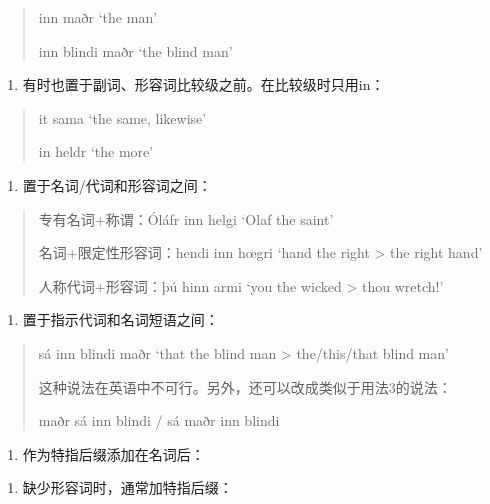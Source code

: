 \begin{quote}
inn maðr `the man'

inn blindi maðr `the blind man'
\end{quote}

\begin{enumerate}
\def\labelenumi{\arabic{enumi})}
\setcounter{enumi}{1}
\item
  有时也置于副词、形容词比较级之前。在比较级时只用in：
\end{enumerate}

\begin{quote}
it sama `the same, likewise'

in heldr `the more'
\end{quote}

\begin{enumerate}
\def\labelenumi{\arabic{enumi})}
\setcounter{enumi}{2}
\item
  置于名词/代词和形容词之间：
\end{enumerate}

\begin{quote}
专有名词+称谓：Óláfr inn helgi `Olaf the saint'

名词+限定性形容词：hendi inn hœgri `hand the right \textgreater{} the
right hand'

人称代词+形容词：þú hinn armi `you the wicked \textgreater{} thou
wretch!'
\end{quote}

\begin{enumerate}
\def\labelenumi{\arabic{enumi})}
\setcounter{enumi}{3}
\item
  置于指示代词和名词短语之间：
\end{enumerate}

\begin{quote}
sá inn blindi maðr `that the blind man \textgreater{} the/this/that
blind man'

这种说法在英语中不可行。另外，还可以改成类似于用法3的说法：

maðr sá inn blindi / sá maðr inn blindi
\end{quote}

\begin{enumerate}
\def\labelenumi{\Alph{enumi}.}
\setcounter{enumi}{1}
\item
  作为特指后缀添加在名词后：
\end{enumerate}

\begin{enumerate}
\def\labelenumi{\arabic{enumi})}
\item
  缺少形容词时，通常加特指后缀：
\end{enumerate}

